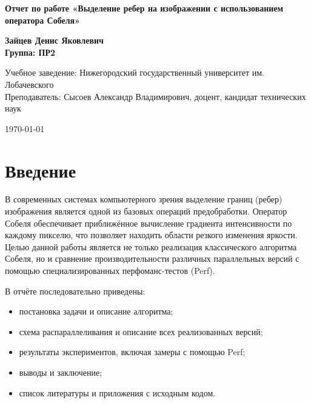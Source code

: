 \documentclass[12pt]{article}
\begin{document}
\begin{titlepage}
\begin{center}
    \vspace*{1cm}

    \textbf{\Large Отчет по работе «Выделение ребер на изображении с использованием оператора Собеля»}

    \vspace{1.5cm}

    \textbf{Зайцев Денис Яковлевич \\
    Группа: ПР2}

    \vfill

    Учебное заведение: Нижегородский государственный университет им. Лобачевского \\
    Преподаватель: Сысоев Александр Владимирович, доцент, кандидат технических наук

    \vspace{0.8cm}

    \today

\end{center}
\end{titlepage}

\tableofcontents
\newpage

\section*{Введение}

В современных системах компьютерного зрения выделение границ (ребер) изображения является одной из базовых операций предобработки. Оператор Собеля обеспечивает приближённое вычисление градиента интенсивности по каждому пикселю, что позволяет находить области резкого изменения яркости. Целью данной работы является не только реализация классического алгоритма Собеля, но и сравнение производительности различных параллельных версий с помощью специализированных перфоманс-тестов (Perf).

\vspace{0.5em}

В отчёте последовательно приведены:
\begin{itemize}
    \item постановка задачи и описание алгоритма;
    \item схема распараллеливания и описание всех реализованных версий;
    \item результаты экспериментов, включая замеры с помощью Perf;
    \item выводы и заключение;
    \item список литературы и приложения с исходным кодом.
\end{itemize}
\end{document}

